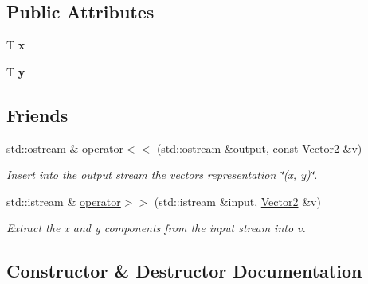 \subsection*{Public Attributes}
\begin{DoxyCompactItemize}
\item 
T {\bfseries x}\hypertarget{classfuzzy_telegram_1_1_vector2_a7d2ec5e647c0f305eac5daab78d958b6}{}\label{classfuzzy_telegram_1_1_vector2_a7d2ec5e647c0f305eac5daab78d958b6}

\item 
T {\bfseries y}\hypertarget{classfuzzy_telegram_1_1_vector2_ababc606f79939def0b456fdb6efce639}{}\label{classfuzzy_telegram_1_1_vector2_ababc606f79939def0b456fdb6efce639}

\end{DoxyCompactItemize}
\subsection*{Friends}
\begin{DoxyCompactItemize}
\item 
std\+::ostream \& \hyperlink{classfuzzy_telegram_1_1_vector2_a42468f8bdb8479b6fb73b56799de28fb}{operator$<$$<$} (std\+::ostream \&output, const \hyperlink{classfuzzy_telegram_1_1_vector2}{Vector2} \&v)
\begin{DoxyCompactList}\small\item\em Insert into the output stream the vector\textquotesingle{}s representation \char`\"{}(x, y)\char`\"{}. \end{DoxyCompactList}\item 
std\+::istream \& \hyperlink{classfuzzy_telegram_1_1_vector2_a8533f7e5d39fb61d3c737c41a6fd1710}{operator$>$$>$} (std\+::istream \&input, \hyperlink{classfuzzy_telegram_1_1_vector2}{Vector2} \&v)
\begin{DoxyCompactList}\small\item\em Extract the x and y components from the input stream into v. \end{DoxyCompactList}\end{DoxyCompactItemize}


\subsection{Constructor \& Destructor Documentation}
